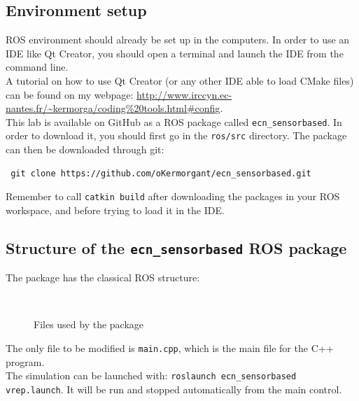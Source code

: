 \documentclass{ecnreport}
\begin{document}
\subsection{Environment setup}

ROS environment should already be set up in the computers. 
In order to use an IDE like Qt Creator, you should open a terminal and launch the IDE from the command line.\\ A tutorial on how to use Qt Creator (or any other IDE 
able to load CMake files) can be found on my webpage: \url{http://www.irccyn.ec-nantes.fr/\~kermorga/coding\%20tools.html\#config}.\\

This lab is available on GitHub as a ROS package called \texttt{ecn\_sensorbased}. In order to download it, you should first go in the \texttt{ros/src} directory. The package can then be downloaded through git:
\begin{center}\cppstyle
\begin{lstlisting}
 git clone https://github.com/oKermorgant/ecn_sensorbased.git
\end{lstlisting}
\end{center}
Remember to call {\tt{catkin build}} after downloading the packages in your ROS workspace, and before trying to load it in the IDE.

\subsection{Structure of the \texttt{ecn\_sensorbased} ROS package}

The package has the classical ROS structure:
\begin{figure}[h]
\begin{minipage}{.25\linewidth} ~ \end{minipage}
\begin{minipage}{.5\linewidth}
\end{minipage}
\caption{Files used by the package}
\end{figure}

The only file to be modified is \texttt{main.cpp}, which is the main file for the C++ program. \\
The simulation can be launched with: \texttt{roslaunch ecn\_sensorbased vrep.launch}. It will be run and stopped automatically from the main control.
\end{document}
